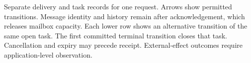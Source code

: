 Separate delivery and task records for one request. Arrows show permitted transitions. Message identity and history remain after acknowledgement, which releases mailbox capacity. Each lower row shows an alternative transition of the same open task. The first committed terminal transition closes that task. Cancellation and expiry may precede receipt. External-effect outcomes require application-level observation. \aifigure
